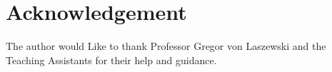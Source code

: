 \documentclass[sigconf]{acmart}
\begin{document}
\section {Acknowledgement}

The author would Like to thank Professor Gregor von Laszewski and the Teaching Assistants for their help and guidance.


 

\appendix


\end{document}
